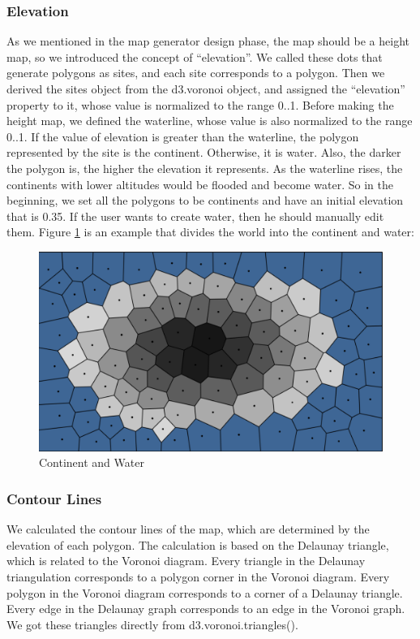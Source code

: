 \subsubsection{Elevation}
As we mentioned in the map generator design phase, the map should be a height map, so we introduced the concept of ``elevation''. We called these dots that generate polygons as sites, and each site corresponds to a polygon. Then we derived the sites object from the d3.voronoi object, and assigned the ``elevation'' property to it, whose value is normalized to the range 0..1. Before making the height map, we defined the waterline, whose value is also normalized to the range 0..1. If the value of elevation is greater than the waterline, the polygon represented by the site is the continent. Otherwise, it is water. Also, the darker the polygon is, the higher the elevation it represents. As the waterline rises, the continents with lower altitudes would be flooded and become water. So in the beginning, we set all the polygons to be continents and have an initial elevation that is 0.35. If the user wants to create water, then he should manually edit them. Figure \ref{fig:Height Map} is an example that divides the world into the continent and water:

\begin{figure}[htbp]
  \includegraphics[width=\textwidth]{section04/assets/Map-heightmap.png}
  \caption{Continent and Water}
  \label{fig:Height Map}
\end{figure}

\subsubsection{Contour Lines}
We calculated the contour lines of the map, which are determined by the elevation of each polygon. The calculation is based on the Delaunay triangle, which is related to the Voronoi diagram. Every triangle in the Delaunay triangulation corresponds to a polygon corner in the Voronoi diagram. Every polygon in the Voronoi diagram corresponds to a corner of a Delaunay triangle. Every edge in the Delaunay graph corresponds to an edge in the Voronoi graph. We got these triangles directly from d3.voronoi.triangles().

